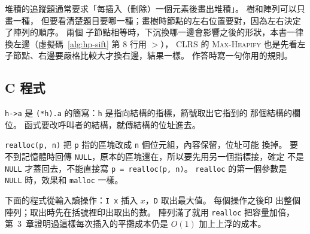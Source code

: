 \begin{examnote}
堆積的追蹤題通常要求「每插入（刪除）一個元素後畫出堆積」。 樹和陣列可以只畫一種，
但要看清楚題目要哪一種；畫樹時節點的左右位置要對，因為左右決定了陣列的順序。 兩個
子節點相等時，下沉換哪一邊會影響之後的形狀，本書一律換左邊（虛擬碼~\ref{alg:hp-sift} 第 8 行用 $>$），
CLRS 的 \textsc{Max-Heapify} 也是先看左子節點、右邊要嚴格比較大才換右邊，結果一樣。
作答時寫一句你用的規則。
\end{examnote}

\subsection{C 程式}

\begin{cbookrecap}[第~14~章 14.5 節、第~19~章 19.3 節]
\texttt{h->a} 是 \texttt{(*h).a} 的簡寫：\texttt{h} 是指向結構的指標，箭號取出它指到的
那個結構的欄位。 函式要改呼叫者的結構，就傳結構的位址進去。

\texttt{realloc(p, n)} 把 \texttt{p} 指的區塊改成 \texttt{n} 個位元組，內容保留，位址可能
換掉。 要不到記憶體時回傳 \texttt{NULL}，原本的區塊還在，所以要先用另一個指標接，確定
不是 \texttt{NULL} 才蓋回去，不能直接寫 \texttt{p = realloc(p, n)}。 \texttt{realloc}
的第一個參數是 \texttt{NULL} 時，效果和 \texttt{malloc} 一樣。
\end{cbookrecap}

下面的程式從輸入讀操作：\texttt{I x} 插入 $x$，\texttt{D} 取出最大值。 每個操作之後印
出整個陣列；取出時先在括號裡印出取出的數。 陣列滿了就用 \texttt{realloc} 把容量加倍，
第~3~章證明過這樣每次插入的平攤成本仍是 $O(1)$ 加上上浮的成本。

